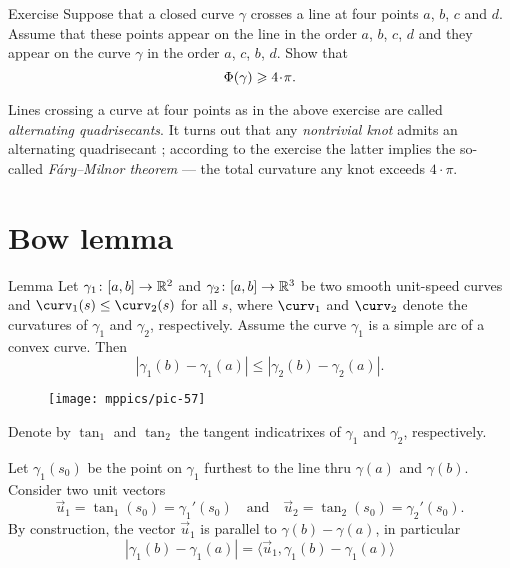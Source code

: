 \begin{thm}{Exercise}\label{ex:quadrisecant}
Suppose that a closed curve $\gamma$ crosses a line at four points $a$, $b$, $c$ and $d$.
Assume that these points appear on the line in the order $a$, $b$, $c$, $d$
and they appear on the curve $\gamma$ in the order $a$, $c$, $b$, $d$.
Show that 
\[\tc\gamma\ge 4\cdot\pi.\]

\end{thm}

Lines crossing a curve at four points as in the above exercise are called \emph{alternating quadrisecants}.
It turns out that any \emph{nontrivial knot} admits an alternating quadrisecant \cite{denne};
according to the exercise the latter implies the so-called \emph{F\'ary--Milnor theorem} --- the total curvature any knot exceeds $4\cdot \pi$.

\section*{Bow lemma}

\begin{thm}{Lemma}\label{lem:bow}
Let $\gamma_1\colon[a,b]\to\mathbb{R}^2$ and $\gamma_2\colon[a,b] \to\mathbb{R}^3$ be two smooth unit-speed curves 
and $\curv_1 (s) \leq \curv _2 (s)$ for all $s$, where $\curv_1 $ and $\curv _2$ denote the curvatures 
of $\gamma_1$ and $\gamma_2$, respectively. Assume the curve 
$\gamma_1$ is a simple arc of a convex curve. Then 
\[|\gamma_1(b)-\gamma_1(a)|\le |\gamma_2(b)-\gamma_2(a)|.\]

\end{thm}

\begin{wrapfigure}{o}{36 mm}
\vskip-7mm
\centering
\texttt{[image: mppics/pic-57]}
\vskip0mm
\end{wrapfigure}

Denote by $\tan_1$ and $\tan_2$ the tangent indicatrixes of $\gamma_1$ and $\gamma_2$, respectively.

Let $\gamma_1(s_0)$ be the point on $\gamma_1$ furthest to the line 
thru $\gamma(a)$ and $\gamma(b)$.
Consider two unit vectors 
\[\vec u_1=\tan_1(s_0)=\gamma_1'(s_0)
\quad\text{and}\quad
\vec u_2=\tan_2(s_0)=\gamma_2'(s_0).\]
By construction, the vector $\vec u_1$ is parallel to $\gamma(b)-\gamma(a)$, in particular
\[|\gamma_1(b)-\gamma_1(a)|=\langle \vec u_1,\gamma_1(b)-\gamma_1(a)\rangle \]

